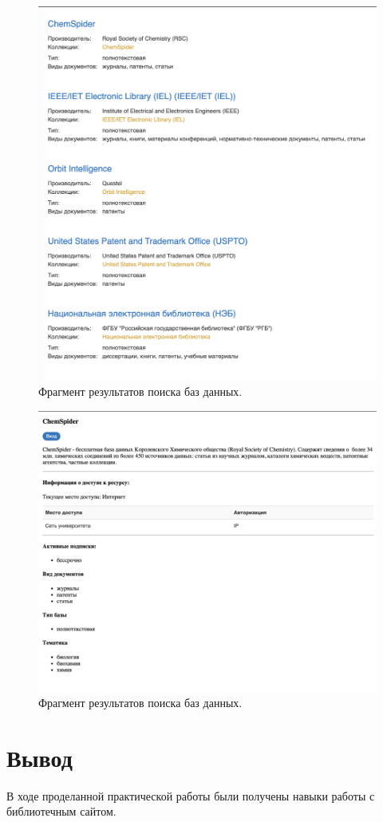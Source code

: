 \documentclass[14pt,a4paper,report]{report}
\begin{document}
\begin{figure}[h!]
\centering
\includegraphics[scale = 0.33]{1310.png}
\caption{Фрагмент результатов поиска баз данных.}
\label{image:1}
\end{figure}

\begin{figure}[h!]
\centering
\includegraphics[scale = 0.33]{1311.png}
\caption{Фрагмент результатов поиска баз данных.}
\label{image:1}
\end{figure}

\section{Вывод}
В ходе проделанной практической работы были получены навыки работы с библиотечным сайтом.
\clearpage
\end{document}
